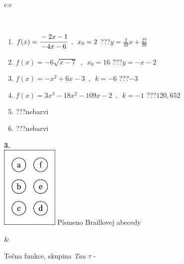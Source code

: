 \documentclass[10pt]{report}
\begin{document}
\begin{tabular}{c:c}
\begin{minipage}[c][104.5mm][t]{0.5\linewidth}
\begin{center}
\begin{minipage}{0.95\linewidth}
\begin{center}
\end{center}
\end{minipage}
\\[1mm]
\begin{minipage}{0.79\linewidth}
\begin{center}
\begin{varwidth}{\linewidth}
\begin{enumerate}
\small
\item $f(x)=\cfrac{-2x-1}{-4x-6}\enspace , \enspace x_0=2$\quad \dotfill\; ???\;\dotfill \quad $y = \frac{2}{49}x+\frac{27}{98}$
\item $f(x)=-6\sqrt{x-7}\enspace , \enspace x_0=16$\quad \dotfill\; ???\;\dotfill \quad $y = -x-2$
\item $f(x)=-x^2+6x-3\enspace , \enspace k=-6$\quad \dotfill\; ???\;\dotfill \quad $-3$
\item $f(x)=3x^3-18x^2-109x-2\enspace , \enspace k=-1$\quad \dotfill\; ???\;\dotfill \quad $120 , 652$
\item \quad \dotfill\; ???\;\dotfill \quad nebarvi
\item \quad \dotfill\; ???\;\dotfill \quad nebarvi
\end{enumerate}
\end{varwidth}
\end{center}
\end{minipage}
\begin{minipage}{0.20\linewidth}
\begin{center}
{\Huge\bfseries 3.} \\[2mm]
\includegraphics[height=40mm]{../images/braille.png}
{\small Písmeno Braillovej abecedy}
\end{center}
\end{minipage}
\end{center}
\end{minipage}
&
\begin{minipage}[c][104.5mm][t]{0.5\linewidth}
\begin{center}
\vspace{7mm}
{\huge Tečna funkce, skupina \textit{Tau $\tau$} -}\\[5mm]

\end{center}
\end{minipage}
\end{tabular}
\end{document}
